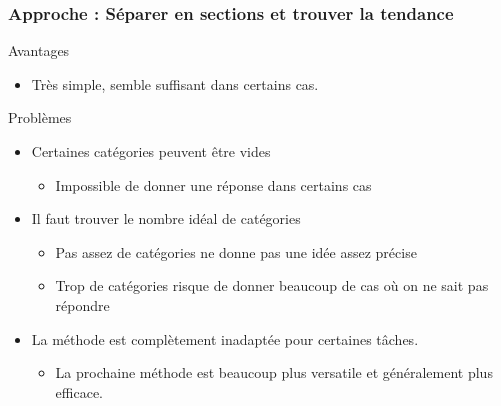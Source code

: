 \documentclass[french]{beamer}
\begin{document}
\begin{frame}
\frametitle{Approche : Séparer en sections et trouver la tendance}

{Avantages}

\begin{itemize}
\itemsep1pt\parskip0pt
\item
  Très simple, semble suffisant dans certains cas.
\end{itemize}

{Problèmes}

\begin{itemize}
\itemsep1pt\parskip0pt
\item
  Certaines catégories peuvent être vides

  \begin{itemize}
  \itemsep1pt\parskip0pt
  \item
    Impossible de donner une réponse dans certains cas
  \end{itemize}
\item
  Il faut trouver le nombre idéal de catégories

  \begin{itemize}
  \itemsep1pt\parskip0pt
  \item
    Pas assez de catégories ne donne pas une idée assez précise
  \item
    Trop de catégories risque de donner beaucoup de cas où on ne sait
    pas répondre
  \end{itemize}
  \item La méthode est complètement inadaptée pour certaines tâches.
  \begin{itemize}
	\item La prochaine méthode est beaucoup plus versatile et généralement plus efficace.  
  
  \end{itemize}  	
	
\end{itemize}
\end{frame}
\end{document}
